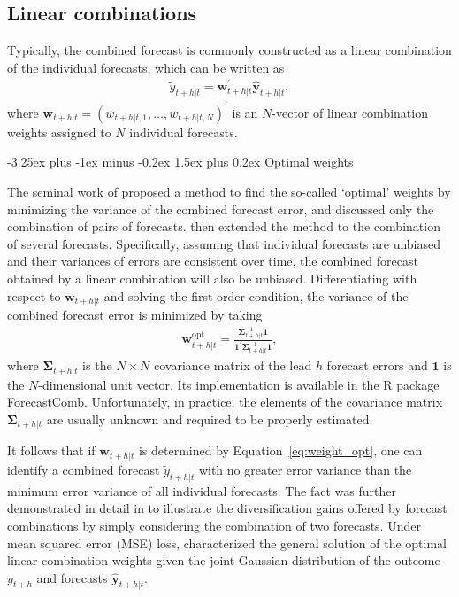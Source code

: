 \documentclass[11pt]{article}
\makeatletter
\newcommand{\pkg}[1]{{\normalfont\fontseries{b}\selectfont #1}}
\let\proglang=\textsf
\renewcommand{\paragraph}{\@startsection{paragraph}{4}{0ex}%
   {-3.25ex plus -1ex minus -0.2ex}%
   {1.5ex plus 0.2ex}%
   {\normalfont\normalsize\bfseries}}
\makeatother
\begin{document}
\subsection{Linear combinations}
\label{sec:linear_combinations}

Typically, the combined forecast is commonly constructed as a linear combination of the individual forecasts, which can be written as
\begin{align}
\label{eq:linear-combinations}
\tilde{y}_{t+h|t}=\boldsymbol{w}_{t+h|t}^{\prime} \hat{\mathbf{y}}_{t+h|t},
\end{align}
where $\boldsymbol{w}_{t+h|t}=\left(w_{t+h|t, 1}, \ldots, w_{t+h|t, N}\right)^{\prime}$ is an $N$-vector of linear combination weights assigned to $N$ individual forecasts.

\paragraph{Optimal weights}

The seminal work of \cite{Bates1969-yj} proposed a method to find the so-called `optimal' weights by minimizing the variance of the combined forecast error, and discussed only the combination of pairs of forecasts. \cite{Newbold1974-lp} then extended the method to the combination of several forecasts. Specifically, assuming that individual forecasts are unbiased and their variances of errors are consistent over time, the combined forecast obtained by a linear combination will also be unbiased. Differentiating with respect to $\boldsymbol{w}_{t+h|t}$ and solving the first order condition, the variance of the combined forecast error is minimized by taking
\begin{align}
\label{eq:weight_opt}
\boldsymbol{w}_{t+h|t}^{\text{opt}}=\frac{\boldsymbol{\Sigma}_{t+h|t}^{-1}\mathbf{1}}{\mathbf{1}^{\prime} \boldsymbol{\Sigma}_{t+h|t}^{-1} \mathbf{1}},
\end{align}
where $\boldsymbol{\Sigma}_{t+h|t}$ is the $N \times N$ covariance matrix of the lead $h$ forecast errors and $\mathbf{1}$ is the $N$-dimensional unit vector. Its implementation is available in the \proglang{R} package \pkg{ForecastComb}. Unfortunately, in practice, the elements of the covariance matrix $\boldsymbol{\Sigma}_{t+h|t}$ are usually unknown and required to be properly estimated.

It follows that if $\boldsymbol{w}_{t+h|t}$ is determined by Equation~\eqref{eq:weight_opt}, one can identify a combined forecast $\tilde{y}_{t+h|t}$ with no greater error variance than the minimum error variance of all individual forecasts. The fact was further demonstrated in detail in \cite{Timmermann2006-en} to illustrate the diversification gains offered by forecast combinations by simply considering the combination of two forecasts. Under mean squared error (MSE) loss, \cite{Timmermann2006-en} characterized the general solution of the optimal linear combination weights given the joint Gaussian distribution of the outcome $y_{t+h}$ and forecasts $\hat{\mathbf{y}}_{t+h|t}$.
\end{document}

